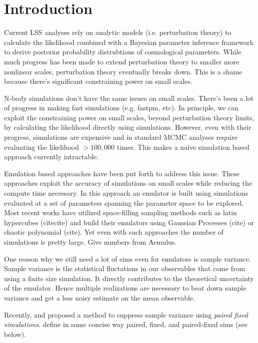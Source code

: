 \section{Introduction} \label{sec:intro} 

Current LSS analyses rely on analytic models (i.e. perturbation theory) to calculate 
the likelihood combined with a Bayesian parameter inference framework to derive 
posterior probability distrubtions of cosmological parameters. While much progress 
has been made to extend perturbation theory to smaller more nonlinear scales, 
perturbation theory eventually breaks down. This is a shame because there's significant 
constraining power on small scales. 

N-body simulations don't have the same issues on small scales. There's been a lot of 
progress in making fast simulations (e.g. fastpm, etc). In principle, we can exploit
the constraining power on small scales, beyond perturbation theory limits, by calculating 
the likelihood directly using simulations. However, even with their progress, simulations 
are expensive and in standard MCMC analyses require evaluating the likelihood $>100,000$ 
times. This makes a naive simulation based approach currently intractable. 

Emulation based approaches have been put forth to address this issue. These approaches 
exploit the accuracy of simulations on small scales while reducing the compute time 
necessary. In this approach an emulator is built using simulations evaluated at a set 
of parameters spanning the parameter space to be explored. Most recent works have 
utilized space-filling sampling methods such as latin hypercubes (citecite) and build
their emulators using Gaussian Processes (cite) or chaotic polynomial (cite). Yet even 
with such approaches the number of simulations is pretty large. Give numbers from Aemulus. 
    
One reason why we still need a lot of sims even for emulators is sample variance. Sample
variance is the statistical fluctations in our observables that come from using a finite 
size simulation. It directly contributes to the theoretical uncertainty of the emulator. 
Hence multiple realizations are necessary to beat down sample variance and get a less 
noisy estimate on the mean observable. 

Recently, \cite{pontzen2016} and \cite{angulo2016} proposed a method to suppress sample
variance using \emph{paired fixed simulations}. define in some concise way paired, fixed, 
and paired-fixed sims (see below). 

